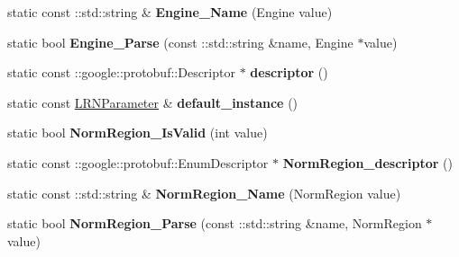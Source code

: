 \begin{DoxyCompactItemize}
\item 
\mbox{\label{classcaffe_1_1_l_r_n_parameter_aea5623a7476a686185920e56429e299a}} 
static const \+::std\+::string \& {\bfseries Engine\+\_\+\+Name} (Engine value)
\item 
\mbox{\label{classcaffe_1_1_l_r_n_parameter_af055dd298a3681dc9c508d4bdbd04505}} 
static bool {\bfseries Engine\+\_\+\+Parse} (const \+::std\+::string \&name, Engine $\ast$value)
\item 
\mbox{\label{classcaffe_1_1_l_r_n_parameter_a88cbfef8ad6763ceba885958a1f020d2}} 
static const \+::google\+::protobuf\+::\+Descriptor $\ast$ {\bfseries descriptor} ()
\item 
\mbox{\label{classcaffe_1_1_l_r_n_parameter_ab03748838ecfd3207b57231690d57db0}} 
static const \mbox{\hyperlink{classcaffe_1_1_l_r_n_parameter}{L\+R\+N\+Parameter}} \& {\bfseries default\+\_\+instance} ()
\item 
\mbox{\label{classcaffe_1_1_l_r_n_parameter_abc572ecb59d920e16e1cea5c410784f6}} 
static bool {\bfseries Norm\+Region\+\_\+\+Is\+Valid} (int value)
\item 
\mbox{\label{classcaffe_1_1_l_r_n_parameter_a26b11f627a561e209a47add19f6d00d8}} 
static const \+::google\+::protobuf\+::\+Enum\+Descriptor $\ast$ {\bfseries Norm\+Region\+\_\+descriptor} ()
\item 
\mbox{\label{classcaffe_1_1_l_r_n_parameter_a1ee8ed9d9a6442706c3b36afe0beb695}} 
static const \+::std\+::string \& {\bfseries Norm\+Region\+\_\+\+Name} (Norm\+Region value)
\item 
\mbox{\label{classcaffe_1_1_l_r_n_parameter_aced9ae2ab7372f962a38df6958d69122}} 
static bool {\bfseries Norm\+Region\+\_\+\+Parse} (const \+::std\+::string \&name, Norm\+Region $\ast$value)
\item 
\mbox{\label{classcaffe_1_1_l_r_n_parameter_adca62a7c5ef42b256d9845737f87616d}} 

\end{DoxyCompactItemize}
